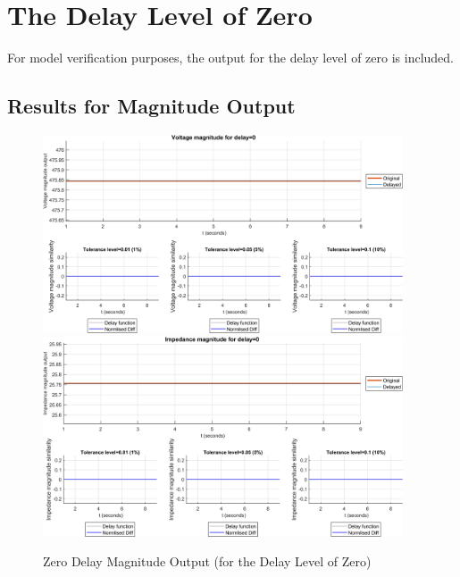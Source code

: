 \section{The Delay Level of Zero}
For model verification purposes, the output for the delay level of zero is included.
\newpage \newpage \subsection{Results for Magnitude Output}
\begin{figure}
    \includegraphics[width=0.95\textwidth]{PMUsim-figures/DelayOf_0/Zero_vMagnitude.png}    
    \label{fig:PMUsim_Zero_vMagnitude}
    \includegraphics[width=0.95\textwidth]{PMUsim-figures/DelayOf_0/Zero_iMagnitude.png}    
    \caption{Zero Delay Magnitude Output (for the Delay Level of Zero)}
    \label{fig:PMUsim_Zero_Magnitude}
\begin{small}
\end{small}
\end{figure}
